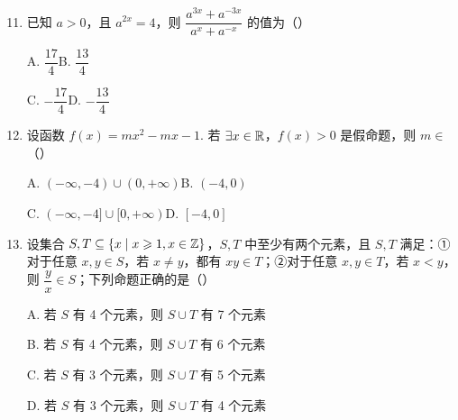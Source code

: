 \documentclass[a4paper,11pt]{article}
\begin{document}
\begin{enumerate}
\setcounter{enumi}{10}

\item 已知 $a>0$，且 $a^{2x}=4$，则 $\dfrac{a^{3x}+a^{-3x}}{a^x+a^{-x}}$ 的值为\mbox{（\quad）}

\keepwithprev
A. $\dfrac{17}4$\qquad B. $\dfrac{13}4$

C. $-\dfrac{17}4$\qquad D. $-\dfrac{13}4$

\ifanswer
{}
\fi

\item 设函数 $f(x)=mx^2-mx-1$. 若 $\exists x\in\mathbb{R}$，$f(x)>0$ 是假命题，则 $m\in$\mbox{（\quad）}

\keepwithprev
A. $(-\infty,-4)\cup(0,+\infty)$\qquad B. $(-4,0)$

C. $(-\infty,-4]\cup[0,+\infty)$\qquad D. $[-4,0]$

\ifanswer
\solbegin
{}
\solend
\fi

\item 设集合 $S,T\subseteq\{x\mid x\geqslant1,x\in\mathbb{Z}\}$，$S,T$ 中至少有两个元素，且 $S,T$ 满足：①对于任意 $x,y\in S$，若 $x\neq y$，都有 $xy\in T$；②对于任意 $x,y\in T$，若 $x<y$，则 $\dfrac yx\in S$；下列命题正确的是\mbox{（\quad）}

\keepwithprev
A. 若 $S$ 有 4 个元素，则 $S\cup T$ 有 7 个元素

B. 若 $S$ 有 4 个元素，则 $S\cup T$ 有 6 个元素

C. 若 $S$ 有 3 个元素，则 $S\cup T$ 有 5 个元素

D. 若 $S$ 有 3 个元素，则 $S\cup T$ 有 4 个元素


\end{enumerate}

\end{document}
